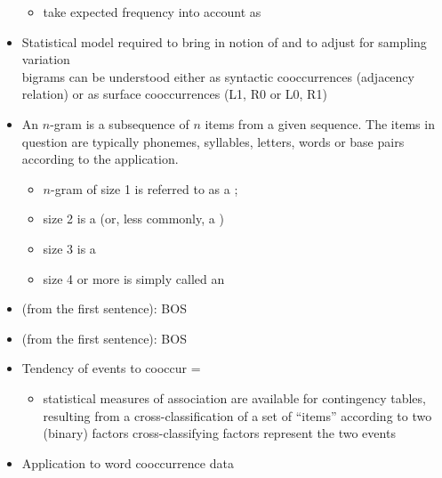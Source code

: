 \documentclass[a4paper,landscape,headrule,footrule,dvips]{foils}
\begin{document}
\begin{CJK}{UTF8}{min}
\begin{itemize}
\begin{itemize}
\item take expected frequency into account as 
\end{itemize}
\item 
Statistical model required to bring in notion of  and to adjust for sampling variation
\\ bigrams can be understood either as syntactic
cooccurrences (adjacency relation) or as surface
cooccurrences (L1, R0 or L0, R1)
\end{itemize}

\begin{itemize}
\item An $n$-gram is a subsequence of $n$ items from a given
  sequence. The items in question are typically phonemes, syllables, letters,
  words or base pairs according to the application.
  \begin{itemize}
  \item $n$-gram of size 1 is referred to as a ;
  \item size 2 is a  (or, less commonly, a )
  \item size 3 is a 
  \item size 4 or more is simply called an 
\end{itemize}
\item {} (from the first sentence):
BOS 
\item {} (from the first sentence):
BOS 
\end{itemize}

\begin{itemize}
\item Tendency of events to cooccur = 
\begin{itemize}
\item statistical measures of association are available for
contingency tables, resulting from a cross-classification
of a set of “items” according to two (binary) factors
cross-classifying factors represent the two events
\end{itemize}
\item Application to word cooccurrence data
\begin{itemize}


\end{itemize}
\end{itemize}
\end{CJK}
\end{document}
